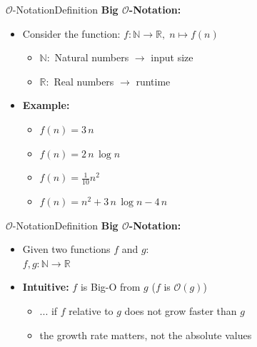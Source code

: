 
\begin{frame}{$\mathcal{O}$-Notation}{Definition}
  \textbf{Big $\mathcal{O}$-Notation:}
  \begin{itemize}
    \item
     Consider the function:
      $f\!: \mathbb{N} \to \mathbb{R}, \; n \mapsto f(n)$
      \begin{itemize}
        \item
          $\mathbb{N}\!:$ Natural numbers $\rightarrow$ input size
        \item
          $\mathbb{R}\!:$ Real numbers $\rightarrow$ runtime
      \end{itemize}
   \item
     \textbf{Example:}
   \begin{itemize}[<+->]
     \item
       $f(n) = 3 \, n$
     \item
       $f(n) = 2 \, n \, \log n$
     \item
       $f(n) = \frac{1}{10} n^2$
     \item
       $f(n) = n^2 + 3 \, n \, \log n - 4 \, n$
    \end{itemize}
  \end{itemize}
\end{frame}


\begin{frame}{$\mathcal{O}$-Notation}{Definition}
  \textbf{Big $\mathcal{O}$-Notation:}
  \begin{itemize}
    \item
      Given two functions $f$ and $g$: \\
      $f,g\!: \mathbb{N} \to \mathbb{R}$
    \item
      \textbf{Intuitive:} $f$ is Big-O from $g$ ($f$ is $\mathcal{O}(g)$)\\
         \begin{itemize}
            \item
            ... if $f$ relative to $g$ does not grow faster than $g$
            \item
                the growth rate matters, not the absolute values
        \end{itemize}
  \end{itemize}
\end{frame}



